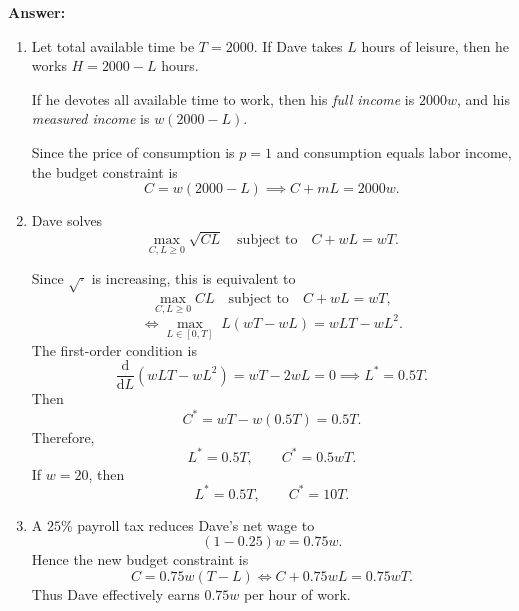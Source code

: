 \documentclass[12pt,a4paper]{article}
\begin{document}
\noindent\textbf{Answer: }
\begin{enumerate}[label=\alph*.]
  \item Let total available time be \(T=2000\). If Dave takes \(L\) hours of leisure, then he works \(H=2000-L\) hours.

  If he devotes all available time to work, then his \emph{full income} is \(2000w\), and his \emph{measured income} is \(w(2000-L)\).

  Since the price of consumption is \(p=1\) and consumption equals labor income, the budget constraint is
  \[
    C=w(2000-L)\implies C+mL = 2000w.
  \]

  \item Dave solves
  \[
    \max_{C,L \ge 0}\sqrt{CL}
    \quad \text{subject to} \quad
    C+wL=wT.
  \]

  Since \(\sqrt{\cdot}\) is increasing, this is equivalent to
  \[
    \max_{C,L\ge 0} CL
    \quad \text{subject to} \quad
    C+wL=wT,
  \]
  \[
    \iff \max_{L\in[0,T]} \; L(wT-wL)=wLT-wL^2.
  \]
  The first-order condition is
  \[
    \frac{\mathrm{d}}{\mathrm{d}L}(wLT-wL^2)=wT-2wL=0\implies L^*=0.5T.
  \]
  Then
  \[
    C^*=wT-w(0.5T)=0.5T.
  \]
  Therefore,
  \[
    L^*=0.5T,\qquad C^*=0.5wT.
  \]
  If \(w=20\), then
  \[
    L^*=0.5T,\qquad C^*=10T.
  \]

  \item A \(25\%\) payroll tax reduces Dave's net wage to
  \[
    (1-0.25)w=0.75w.
  \]
  Hence the new budget constraint is
  \[
    C=0.75w(T-L) \iff C+0.75wL=0.75wT.
  \]
  Thus Dave effectively earns \(0.75w\) per hour of work.

  \begin{center}
  \end{center}


\end{enumerate}
\end{document}
